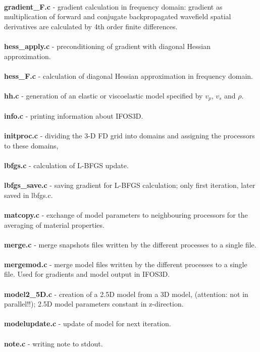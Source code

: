 \\
\textbf{gradient\_F.c} - gradient calculation in frequency domain: gradient as multiplication of forward and conjugate backpropagated wavefield spatial derivatives are calculated by 4th order finite differences.\\
\\
\textbf{hess\_apply.c} - preconditioning of gradient with diagonal Hessian approximation.\\
\\
\textbf{hess\_F.c} - calculation of diagonal Hessian approximation in frequency domain.\\
\\
\textbf{hh.c} - generation of an elastic or viscoelastic model specified by $v_p$, $v_s$ and $\rho$.\\
\\
\textbf{info.c} - printing information about IFOS3D.\\
\\
\textbf{initproc.c} - dividing the 3-D FD grid into domains and assigning the processors to these domains,\\
\\
\textbf{lbfgs.c} - calculation of L-BFGS update.\\
\\
\textbf{lbfgs\_save.c} - saving gradient for L-BFGS calculation; only first iteration, later saved in lbfgs.c.\\
\\
\textbf{matcopy.c} - exchange of model parameters to neighbouring processors for the averaging of material properties.\\
\\
\textbf{merge.c} - merge snapshots files written by the different processes to a single file. \\
\\
\textbf{mergemod.c} - merge model files written by the different processes to a single file. Used for gradients and model output in IFOS3D. \\
\\
\textbf{model2\_5D.c} - creation of a 2.5D model from a 3D model, (attention: not in parallel!!); 2.5D model parameters constant in z-direction.\\
\\
\textbf{modelupdate.c} - update of model for next iteration.\\
\\
\textbf{note.c} - writing note to stdout.\\
